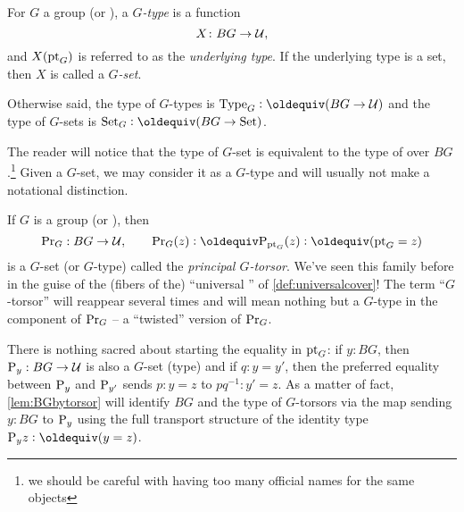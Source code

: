\begin{definition}
  For $G$ a group (or \inftygp), a \emph{$G$-type} is a function
  $$X\colon BG\to\mathcal{U},$$
and $X({\mathord{\mathrm{pt}}}_G)$ is referred to as the \emph{underlying type}.
If the underlying type is a set, then $X$ is called a \emph{$G$-set}.

Otherwise said, the type of $G$-types is $\Type_G\defequi(BG\to\UU)$ and the type of $G$-sets is $\Set_G\defequi(BG\to\Set)$.
\end{definition}

\begin{remark}
  The reader will notice that the type of $G$-set is equivalent to the type of \coverings over $BG$.\footnote{we should be careful with having too many official names for the same objects}
Given a $G$-set, we may consider it as a $G$-type and will usually not make a notational distinction.
\end{remark}


\begin{example}\label{def:principaltorsor}
  If $G$ is a group (or \inftygp), then
$$\princ G:BG\to\UU,\qquad\princ G(z)\defequi\pathsp{\pt_G}(z)\defequi(\pt_G=z)$$ is a $G$-set (or $G$-type) called the \emph{principal $G$-torsor}.  
We've seen this family before in the guise of the (fibers of the) ``universal \covering'' of \cref{def:universalcover}!  
The term ``$G$-torsor'' will reappear several times and will mean nothing but a $G$-type in the component of $\mathrm{Pr}_{{G}}$ -- a ``twisted'' version of $\mathrm{Pr}_{{G}}$.

There is nothing sacred about starting the equality in ${\mathord{\mathrm{pt}}}_G$: if $y:BG$, then $\mathrm{P}_{y}:BG\to\mathcal{U}$ is also a $G$-set (type) and if $q:y=y'$, then the preferred equality between $\mathrm{P}_{y}$ and $\mathrm{P}_{y'}$ sends $p:y=z$ to $pq^{-1}:y'=z$.  As a matter of fact, \cref{lem:BGbytorsor} will identify $BG$ and the type of $G$-torsors via the map sending $y:BG$ to $\mathrm{P}_{y}$ using the full transport structure of the identity type $\pathsp yz\defequi(y=z)$.
 
\end{example}

